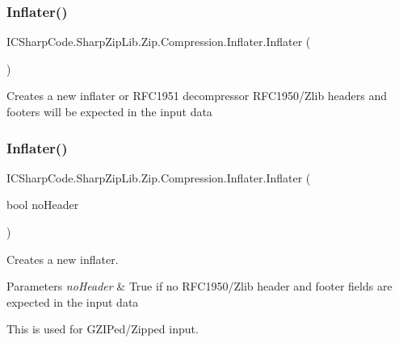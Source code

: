 \subsubsection{\texorpdfstring{Inflater()}{Inflater()}\hspace{0.1cm}{\footnotesize\ttfamily [1/4]}}
{\footnotesize\ttfamily I\+C\+Sharp\+Code.\+Sharp\+Zip\+Lib.\+Zip.\+Compression.\+Inflater.\+Inflater (\begin{DoxyParamCaption}{ }\end{DoxyParamCaption})\hspace{0.3cm}{\ttfamily [inline]}}



Creates a new inflater or R\+F\+C1951 decompressor R\+F\+C1950/\+Zlib headers and footers will be expected in the input data 

\mbox{\label{class_i_c_sharp_code_1_1_sharp_zip_lib_1_1_zip_1_1_compression_1_1_inflater_a89e97fe8e5522be57c2de110655fbefb}} 
\subsubsection{\texorpdfstring{Inflater()}{Inflater()}\hspace{0.1cm}{\footnotesize\ttfamily [2/4]}}
{\footnotesize\ttfamily I\+C\+Sharp\+Code.\+Sharp\+Zip\+Lib.\+Zip.\+Compression.\+Inflater.\+Inflater (\begin{DoxyParamCaption}\item[{bool}]{no\+Header }\end{DoxyParamCaption})\hspace{0.3cm}{\ttfamily [inline]}}



Creates a new inflater. 


\begin{DoxyParams}{Parameters}
{\em no\+Header} & True if no R\+F\+C1950/\+Zlib header and footer fields are expected in the input data\\
\hline
\end{DoxyParams}
This is used for G\+Z\+I\+Ped/\+Zipped input.

